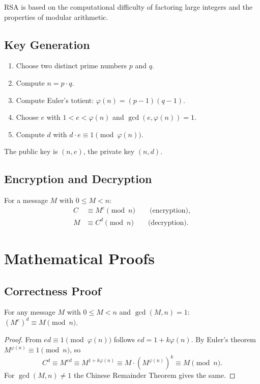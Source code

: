 RSA is based on the computational difficulty of factoring large integers
and the properties of modular arithmetic.

\subsection{Key Generation}

\begin{enumerate}
  \item Choose two distinct prime numbers $p$ and $q$.
  \item Compute $n = p \cdot q$.
  \item Compute Euler's totient: $\varphi(n) = (p-1)(q-1)$.
  \item Choose $e$ with $1 < e < \varphi(n)$ and $\gcd(e,\varphi(n))=1$.
  \item Compute $d$ with $d \cdot e \equiv 1 \pmod{\varphi(n)}$.
\end{enumerate}

The public key is $(n,e)$, the private key $(n,d)$.

\subsection{Encryption and Decryption}

For a message $M$ with $0 \le M < n$:
\begin{align}
  C &\equiv M^e \pmod n \qquad \text{(encryption)}, \\
  M &\equiv C^d \pmod n \qquad \text{(decryption)}.
\end{align}

\section{Mathematical Proofs}

\subsection{Correctness Proof}

\begin{theorem}
For any message $M$ with $0 \le M < n$ and $\gcd(M,n)=1$:
$(M^e)^d \equiv M \pmod n$.
\end{theorem}
\begin{proof}
From $ed \equiv 1 \pmod{\varphi(n)}$ follows $ed = 1+k\varphi(n)$.
By Euler's theorem $M^{\varphi(n)} \equiv 1 \pmod n$, so
\[
  C^d \equiv M^{ed} \equiv M^{1+k\varphi(n)} \equiv
  M\cdot(M^{\varphi(n)})^k \equiv M \pmod n.
\]
For $\gcd(M,n)\neq 1$ the Chinese Remainder Theorem gives the same.
\end{proof}

